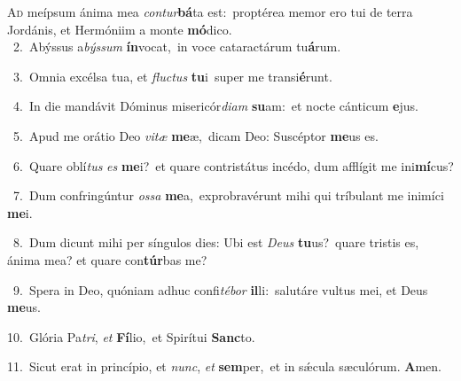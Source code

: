 \lettrine{\initial\textcolor{\initialcolor}{A}}{d} meípsum ánima mea \textit{con}\-\textit{tur}\textbf{bá}ta est:~\star proptérea memor ero tui de terra Jordánis, et Hermóniim a monte \textbf{mó}\-dico.\\
{\numbfont\textcolor{\numbcolor}{~2.}}~Abýssus a\-\textit{býs}\-\textit{sum} \textbf{ín}\-vocat,~\star in voce cataractárum tu\-\textbf{á}\-rum.\par
{\numbfont\textcolor{\numbcolor}{~3.}}~Omnia excélsa tua, et \textit{fluc}\-\textit{tus} \textbf{tu}\-i~\star super me transi\-\textbf{é}\-runt.\par
{\numbfont\textcolor{\numbcolor}{~4.}}~In die mandávit Dóminus misericór\-\textit{di}\-\textit{am} \textbf{su}\-am:~\star et nocte cánticum \textbf{e}\-jus.\par
{\numbfont\textcolor{\numbcolor}{~5.}}~Apud me orátio Deo \textit{vi}\-\textit{tæ} \textbf{me}\-æ,~\star dicam Deo: Suscéptor \textbf{me}\-us es.\par
{\numbfont\textcolor{\numbcolor}{~6.}}~Quare oblí\textit{tus} \textit{es} \textbf{me}\-i?~\star et quare contristátus incédo, dum afflígit me ini\-\textbf{mí}\-cus?\par
{\numbfont\textcolor{\numbcolor}{~7.}}~Dum confringúntur \textit{os}\-\textit{sa} \textbf{me}\-a,~\star exprobravérunt mihi qui tríbulant me inimíci \textbf{me}\-i.\par
{\numbfont\textcolor{\numbcolor}{~8.}}~Dum dicunt mihi per síngulos dies: Ubi est \textit{De}\-\textit{us} \textbf{tu}\-us?~\star quare tristis es, ánima mea? et quare con\-\textbf{túr}\-bas me?\par
{\numbfont\textcolor{\numbcolor}{~9.}}~Spera in Deo, quóniam adhuc confi\-\textit{té}\-\textit{bor} \textbf{il}\-li:~\star salutáre vultus mei, et Deus \textbf{me}\-us.\par
{\numbfont\textcolor{\numbcolor}{10.}}~Glória Pa\-\textit{tri}\-, \textit{et} \textbf{Fí}\-lio,~\star et Spirítui \textbf{Sanc}\-to.\par
{\numbfont\textcolor{\numbcolor}{11.}}~Sicut erat in princípio, et \textit{nunc}\-, \textit{et} \textbf{sem}\-per,~\star et in sǽcula sæculórum. \textbf{A}\-men.\par
